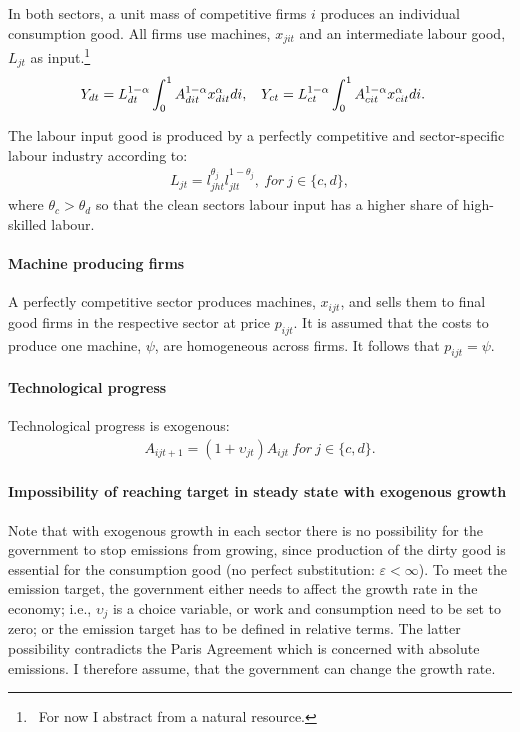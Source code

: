 In both sectors, a unit mass of competitive firms $i$ produces an individual consumption good. All firms use machines, $x_{jit}$ and an intermediate labour good, $L_{jt}$ as input.\footnote{\ For now I abstract from a natural resource.} 
\begin{align*}
&Y_{dt}= L_{dt}^{1-\alpha}\int_{0}^{1}A_{dit}^{1-\alpha}x_{dit}^{\alpha} di,\ \hspace{2mm} Y_{ct}= L_{ct}^{1-\alpha}\int_{0}^{1}A_{cit}^{1-\alpha}x_{cit}^{\alpha} di.
\end{align*}

The labour input good is produced by a perfectly competitive and sector-specific labour industry according to: 
\begin{align}
L_{jt}=l_{jht}^{\theta_j}l_{jlt}^{1-\theta_j}, \ for \ j \in\{c,d\},
\end{align}
where $\theta_c>\theta_d$ so that the clean sectors labour input has a higher share of high-skilled labour. 


\paragraph{Machine producing firms}
A perfectly competitive sector produces machines, $x_{ijt}$, and sells them to final good firms in the respective sector at price $p_{ijt}$. It is assumed that the costs to produce one machine, $\psi$, are homogeneous across firms. It follows that $p_{ijt}=\psi$.


\paragraph{Technological progress}
Technological progress is exogenous:
\begin{align}
A_{ijt+1}=(1+\upsilon_{jt}) A_{ijt}\ for \ j \in\{c,d\}. 
\end{align}

\paragraph{Impossibility of reaching target in steady state with exogenous growth}
Note that with exogenous growth in each sector there is no possibility for the government to stop emissions from growing, since production of the dirty good is essential for the consumption good (no perfect substitution: $\varepsilon<\infty$). To meet the emission target, the government either needs to affect the growth rate in the economy; i.e., $\upsilon_j$ is a choice variable, or work and consumption need to be set to zero; or the emission target has to be defined in relative terms. The latter possibility contradicts the Paris Agreement which is concerned with absolute emissions.  
I therefore assume, that the government can change the growth rate.

